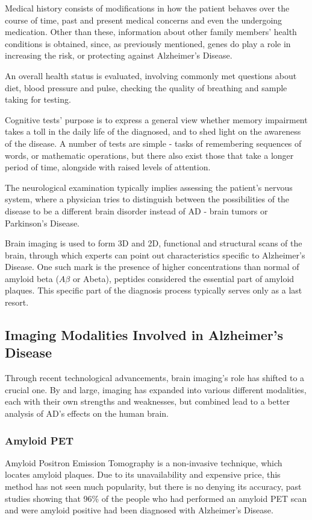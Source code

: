 \documentclass[a4paper, 12pt]{article}
\begin{document}
Medical history consists of modifications in how the patient behaves over the course of time, past and present medical concerns
and even the undergoing medication. Other than these, information about other family members' health conditions is obtained, since,
as previously mentioned, genes do play a role in increasing the risk, or protecting against Alzheimer's Disease.

An overall health status is evaluated, involving commonly met questions about diet, blood pressure and pulse, checking
the quality of breathing and sample taking for testing.

Cognitive tests' purpose is to express a general view whether memory impairment takes a toll in the daily life of the diagnosed,
and to shed light on the awareness of the disease. A number of tests are simple - tasks of remembering sequences of words, or
mathematic operations, but there also exist those that take a longer period of time, alongside with raised levels of attention.

The neurological examination typically implies assessing the patient's nervous system, where a physician tries to distinguish
between the possibilities of the disease to be a different brain disorder instead of AD - brain tumors or Parkinson's Disease.

Brain imaging is used to form 3D and 2D, functional and structural scans of the brain, through which experts can point out
characteristics specific to Alzheimer's Disease. One such mark is the presence of higher concentrations than normal of amyloid
beta ($A\beta $ or Abeta), peptides considered the essential part of amyloid plaques. This specific part of the diagnosis
process typically serves only as a last resort. \\
\cite{AA2}


\subsection{Imaging Modalities Involved in Alzheimer's Disease} %
Through recent technological advancements, brain imaging's role has shifted to a crucial one. By and large, imaging has
expanded into various different modalities, each with their own strengths and weaknesses, but combined lead to a better
analysis of AD's effects on the human brain. \cite{Johnson2012BrainII}

\subsubsection*{Amyloid PET} %
Amyloid Positron Emission Tomography is a non-invasive technique, which locates amyloid plaques.
Due to its unavailability and expensive price, this method has not seen much popularity, but
there is no denying its accuracy, past studies showing that 96\% of the people who had performed an
amyloid PET scan and were amyloid positive had been diagnosed with Alzheimer's Disease.\\
\cite{Johnson2012BrainII}
\end{document}

